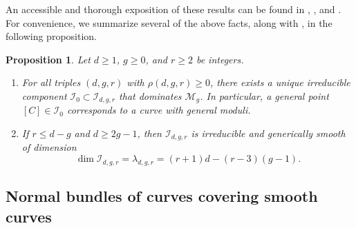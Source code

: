 \documentclass[a4paper,12pt]{amsart}
\newtheorem{prop}[thm]{Proposition}
\def\dim{\operatorname{dim}}
\begin{document}
An accessible and thorough exposition of these results can be found in \cite{Har82}, \cite{CS87}, and \cite{EH24}. For convenience, we summarize several of the above facts, along with \cite[Theorem~13.6, p.~484]{CS87}, in the following proposition.

\begin{prop}\label{Sec3_Hilb_Sch_irred}
Let $d \geq 1$, $g \geq 0$, and $r \geq 2$ be integers.
\begin{enumerate}[label=(\roman*), leftmargin=*, font=\rmfamily]
 \item For all triples $(d, g, r)$ with $\rho(d, g, r) \geq 0$, there exists a unique irreducible component $\mathcal{I}_0 \subset \mathcal{I}_{d,g,r}$ that dominates $\mathcal{M}_g$. In particular, a general point $[C] \in \mathcal{I}_0$ corresponds to a curve with general moduli.

 \item If $r \leq d - g$ and $d \geq 2g - 1$, then $\mathcal{I}_{d,g,r}$ is irreducible and generically smooth of dimension
 \[
 \dim \mathcal{I}_{d,g,r} = \lambda_{d,g,r} = (r+1)d - (r - 3)(g - 1).
 \]
\end{enumerate}
\end{prop}

\medskip

\subsection{Normal bundles of curves covering smooth curves}\label{Sec32}
\end{document}
